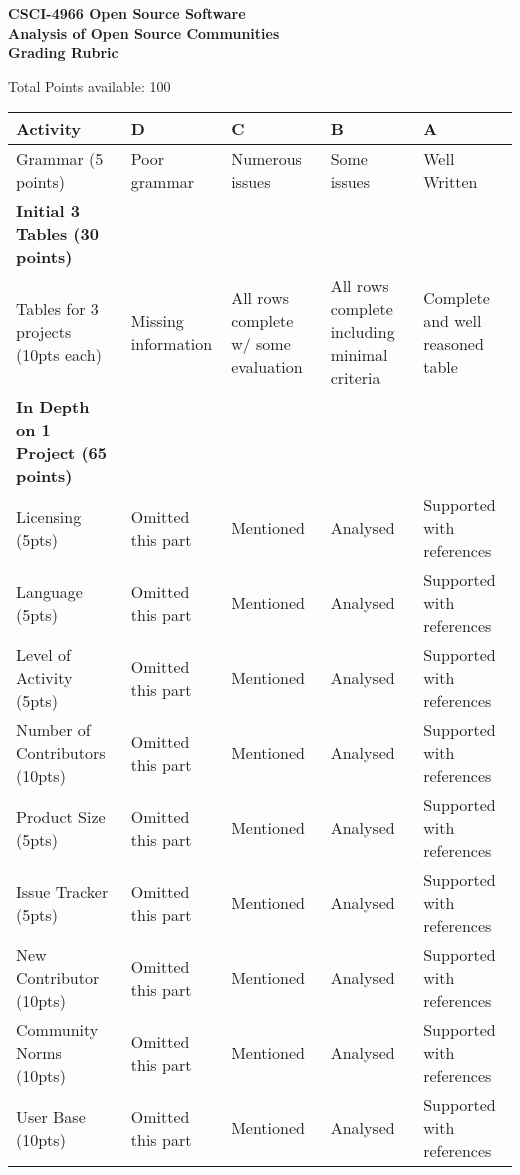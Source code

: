 \documentclass[11pt]{article}
\begin{document}
\begin{center}
\Large
\textbf{CSCI-4966 Open Source Software \\
Analysis of Open Source Communities \\
Grading Rubric}
\end{center}

Total Points available: 100 \\
\begin{tabularx}{\linewidth}{|l|X|X|X|X|}
	\hline
	Activity & D & C & B & A \\ \hline
	Grammar (5 points) & Poor grammar & Numerous issues & Some issues & Well Written \\ \hline
	\textbf{Initial 3 Tables (30 points)} & & & & \\ \hline
	Tables for 3 projects (10pts each) & Missing information & All rows complete w/ some evaluation & All rows complete including minimal criteria & Complete and well reasoned table \\ \hline
    \textbf{In Depth on 1 Project (65 points)}  & & & & \\ \hline
	Licensing (5pts) & Omitted this part & Mentioned & Analysed &Supported with references \\ \hline
	Language (5pts) & Omitted this part & Mentioned & Analysed &Supported with references \\ \hline
	Level of Activity (5pts) & Omitted this part & Mentioned & Analysed &Supported with references \\ \hline
	Number of Contributors (10pts) & Omitted this part & Mentioned & Analysed &Supported with references \\ \hline
	Product Size (5pts) & Omitted this part & Mentioned & Analysed &Supported with references \\ \hline
	Issue Tracker (5pts) & Omitted this part & Mentioned & Analysed &Supported with references \\ \hline
	New Contributor (10pts) & Omitted this part & Mentioned & Analysed &Supported with references \\ \hline
	Community Norms (10pts) & Omitted this part & Mentioned & Analysed &Supported with references \\ \hline
	User Base (10pts) & Omitted this part & Mentioned & Analysed &Supported with references \\ \hline
\end{tabularx}
\end{document}
